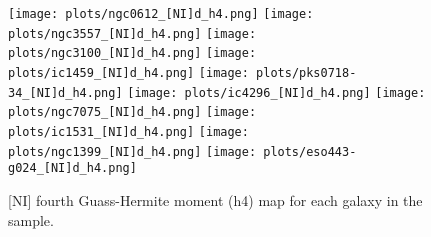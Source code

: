 \documentclass[fleqn,usenatbib,useAMS]{mnras}
\begin{document}
        \begin{figure*}
            \centering
            \texttt{[image: plots/ngc0612\_[NI]d\_h4.png]}
            \texttt{[image: plots/ngc3557\_[NI]d\_h4.png]}
            \texttt{[image: plots/ngc3100\_[NI]d\_h4.png]}
            \texttt{[image: plots/ic1459\_[NI]d\_h4.png]}
            \texttt{[image: plots/pks0718-34\_[NI]d\_h4.png]}
            \texttt{[image: plots/ic4296\_[NI]d\_h4.png]}
            \texttt{[image: plots/ngc7075\_[NI]d\_h4.png]}
            \texttt{[image: plots/ic1531\_[NI]d\_h4.png]}
            \texttt{[image: plots/ngc1399\_[NI]d\_h4.png]}
            \texttt{[image: plots/eso443-g024\_[NI]d\_h4.png]}
            \caption{[NI] fourth Guass-Hermite moment (h4) map for each galaxy in the sample.}
            \label{fig:NI_h4}
        \end{figure*}
\end{document}
